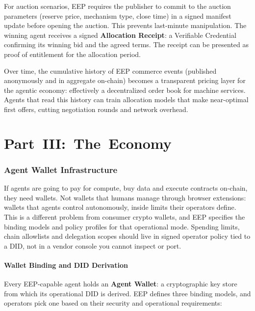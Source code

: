 \documentclass[12pt,a4paper]{article}
\begin{document}
For auction scenarios, EEP requires the publisher to commit to the auction parameters (reserve price, mechanism type, close time) in a signed manifest update before opening the auction. This prevents last-minute manipulation. The winning agent receives a signed \textbf{Allocation Receipt}: a Verifiable Credential confirming its winning bid and the agreed terms. The receipt can be presented as proof of entitlement for the allocation period.

Over time, the cumulative history of EEP commerce events (published anonymously and in aggregate on-chain) becomes a transparent pricing layer for the agentic economy: effectively a decentralized order book for machine services. Agents that read this history can train allocation models that make near-optimal first offers, cutting negotiation rounds and network overhead.

\part*{Part~III:~The~Economy}
\section{Agent Wallet Infrastructure}
\label{sec:wallet}

If agents are going to pay for compute, buy data and execute contracts on-chain, they need wallets. Not wallets that humans manage through browser extensions: wallets that agents control autonomously, inside limits their operators define. This is a different problem from consumer crypto wallets, and EEP specifies the binding models and policy profiles for that operational mode. Spending limits, chain allowlists and delegation scopes should live in signed operator policy tied to a DID, not in a vendor console you cannot inspect or port.

\subsection{Wallet Binding and DID Derivation}

Every EEP-capable agent holds an \textbf{Agent Wallet}: a cryptographic key store from which its operational DID is derived. EEP defines three binding models, and operators pick one based on their security and operational requirements:
\end{document}
